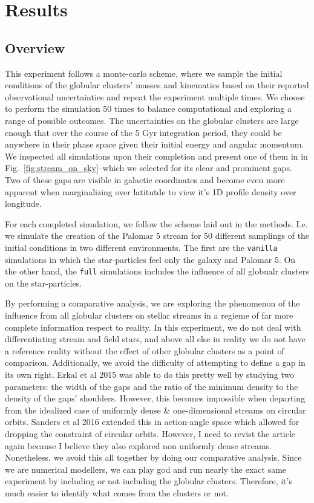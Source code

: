 \documentclass[draft]{aa}
\begin{document}
\section{Results}

  \subsection*{Overview}
  This experiment follows a monte-carlo scheme, where we sample the initial conditions of the globular clusters' masses and kinematics based on their reported observational uncertainties and repeat the experiment multiple times. We choose to perform the simulation 50 times to balance computational and exploring a range of possible outcomes. The uncertainties on the globular clusters are large enough that over the course of the 5 Gyr integration period, they could be anywhere in their phase space given their initial energy and angular momentum. We inspected all simulations upon their completion and present one of them in in Fig.~\ref{fig:stream_on_sky}--which we selected for its clear and prominent gaps. Two of these gaps are visible in galactic coordinates and become even more apparent when marginalizing over latitutde to view it's 1D profile density over longitude. 

  For each completed simulation, we follow the scheme laid out in the methods. I.e. we simulate the creation of the Palomar 5 stream for 50 different samplings of the initial conditions in two different environments. The first are the \texttt{vanilla} simulations in which the star-particles feel only the galaxy and Palomar 5. On the other hand, the \texttt{full} simulations includes the influence of all globualr clusters on the star-particles. 
  
  By performing a comparative analysis, we are exploring the phenomenon of the influence from all globular clusters on stellar streams in a regieme of far more complete information respect to reality. In this experiment, we do not deal with differentiating stream and field stars, and above all else in reality we do not have a reference reality without the effect of other globular clusters as a point of comparison. Additionally, we avoid the difficulty of attempting to define a gap in its own right. Erkal et al 2015 was able to do this pretty well by studying two parameters: the width of the gaps and the ratio of the minimum density to the density of the gaps' shoulders. However, this becomes impossible when departing from the idealized case of uniformly dense \& one-dimensional streams on circular orbits. Sanders et al 2016 extended this in action-angle space which allowed for dropping the constraint of circular orbits. However, I need to revist the article again because I believe they also explored non uniformly dense streams. Nonetheless, we avoid this all together by doing our comparative analysis. Since we are numerical modellers, we can play god and run nearly the exact same experiment by including or not including the globular clusters. Therefore, it's much easier to identify what comes from the clusters or not. 
\end{document}
